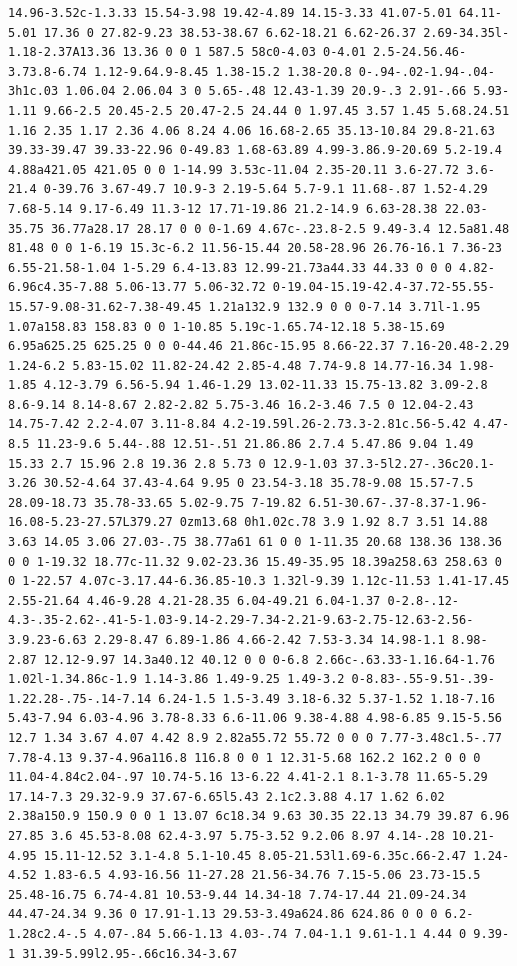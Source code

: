 \documentclass[11pt]{article}
\begin{document}
\begin{enumerate}
\begin{verbatim}
14.96-3.52c-1.3.33 15.54-3.98 19.42-4.89 14.15-3.33 41.07-5.01 64.11-5.01 17.36 0 27.82-9.23 38.53-38.67 6.62-18.21 6.62-26.37 2.69-34.35l-1.18-2.37A13.36 13.36 0 0 1 587.5 58c0-4.03 0-4.01 2.5-24.56.46-3.73.8-6.74 1.12-9.64.9-8.45 1.38-15.2 1.38-20.8 0-.94-.02-1.94-.04-3h1c.03 1.06.04 2.06.04 3 0 5.65-.48 12.43-1.39 20.9-.3 2.91-.66 5.93-1.11 9.66-2.5 20.45-2.5 20.47-2.5 24.44 0 1.97.45 3.57 1.45 5.68.24.51 1.16 2.35 1.17 2.36 4.06 8.24 4.06 16.68-2.65 35.13-10.84 29.8-21.63 39.33-39.47 39.33-22.96 0-49.83 1.68-63.89 4.99-3.86.9-20.69 5.2-19.4 4.88a421.05 421.05 0 0 1-14.99 3.53c-11.04 2.35-20.11 3.6-27.72 3.6-21.4 0-39.76 3.67-49.7 10.9-3 2.19-5.64 5.7-9.1 11.68-.87 1.52-4.29 7.68-5.14 9.17-6.49 11.3-12 17.71-19.86 21.2-14.9 6.63-28.38 22.03-35.75 36.77a28.17 28.17 0 0 0-1.69 4.67c-.23.8-2.5 9.49-3.4 12.5a81.48 81.48 0 0 1-6.19 15.3c-6.2 11.56-15.44 20.58-28.96 26.76-16.1 7.36-23 6.55-21.58-1.04 1-5.29 6.4-13.83 12.99-21.73a44.33 44.33 0 0 0 4.82-6.96c4.35-7.88 5.06-13.77 5.06-32.72 0-19.04-15.19-42.4-37.72-55.55-15.57-9.08-31.62-7.38-49.45 1.21a132.9 132.9 0 0 0-7.14 3.71l-1.95 1.07a158.83 158.83 0 0 1-10.85 5.19c-1.65.74-12.18 5.38-15.69 6.95a625.25 625.25 0 0 0-44.46 21.86c-15.95 8.66-22.37 7.16-20.48-2.29 1.24-6.2 5.83-15.02 11.82-24.42 2.85-4.48 7.74-9.8 14.77-16.34 1.98-1.85 4.12-3.79 6.56-5.94 1.46-1.29 13.02-11.33 15.75-13.82 3.09-2.8 8.6-9.14 8.14-8.67 2.82-2.82 5.75-3.46 16.2-3.46 7.5 0 12.04-2.43 14.75-7.42 2.2-4.07 3.11-8.84 4.2-19.59l.26-2.73.3-2.81c.56-5.42 4.47-8.5 11.23-9.6 5.44-.88 12.51-.51 21.86.86 2.7.4 5.47.86 9.04 1.49 15.33 2.7 15.96 2.8 19.36 2.8 5.73 0 12.9-1.03 37.3-5l2.27-.36c20.1-3.26 30.52-4.64 37.43-4.64 9.95 0 23.54-3.18 35.78-9.08 15.57-7.5 28.09-18.73 35.78-33.65 5.02-9.75 7-19.82 6.51-30.67-.37-8.37-1.96-16.08-5.23-27.57L379.27 0zm13.68 0h1.02c.78 3.9 1.92 8.7 3.51 14.88 3.63 14.05 3.06 27.03-.75 38.77a61 61 0 0 1-11.35 20.68 138.36 138.36 0 0 1-19.32 18.77c-11.32 9.02-23.36 15.49-35.95 18.39a258.63 258.63 0 0 1-22.57 4.07c-3.17.44-6.36.85-10.3 1.32l-9.39 1.12c-11.53 1.41-17.45 2.55-21.64 4.46-9.28 4.21-28.35 6.04-49.21 6.04-1.37 0-2.8-.12-4.3-.35-2.62-.41-5-1.03-9.14-2.29-7.34-2.21-9.63-2.75-12.63-2.56-3.9.23-6.63 2.29-8.47 6.89-1.86 4.66-2.42 7.53-3.34 14.98-1.1 8.98-2.87 12.12-9.97 14.3a40.12 40.12 0 0 0-6.8 2.66c-.63.33-1.16.64-1.76 1.02l-1.34.86c-1.9 1.14-3.86 1.49-9.25 1.49-3.2 0-8.83-.55-9.51-.39-1.22.28-.75-.14-7.14 6.24-1.5 1.5-3.49 3.18-6.32 5.37-1.52 1.18-7.16 5.43-7.94 6.03-4.96 3.78-8.33 6.6-11.06 9.38-4.88 4.98-6.85 9.15-5.56 12.7 1.34 3.67 4.07 4.42 8.9 2.82a55.72 55.72 0 0 0 7.77-3.48c1.5-.77 7.78-4.13 9.37-4.96a116.8 116.8 0 0 1 12.31-5.68 162.2 162.2 0 0 0 11.04-4.84c2.04-.97 10.74-5.16 13-6.22 4.41-2.1 8.1-3.78 11.65-5.29 17.14-7.3 29.32-9.9 37.67-6.65l5.43 2.1c2.3.88 4.17 1.62 6.02 2.38a150.9 150.9 0 0 1 13.07 6c18.34 9.63 30.35 22.13 34.79 39.87 6.96 27.85 3.6 45.53-8.08 62.4-3.97 5.75-3.52 9.2.06 8.97 4.14-.28 10.21-4.95 15.11-12.52 3.1-4.8 5.1-10.45 8.05-21.53l1.69-6.35c.66-2.47 1.24-4.52 1.83-6.5 4.93-16.56 11-27.28 21.56-34.76 7.15-5.06 23.73-15.5 25.48-16.75 6.74-4.81 10.53-9.44 14.34-18 7.74-17.44 21.09-24.34 44.47-24.34 9.36 0 17.91-1.13 29.53-3.49a624.86 624.86 0 0 0 6.2-1.28c2.4-.5 4.07-.84 5.66-1.13 4.03-.74 7.04-1.1 9.61-1.1 4.44 0 9.39-1 31.39-5.99l2.95-.66c16.34-3.67 
\end{verbatim}
\end{enumerate}
\end{document}
